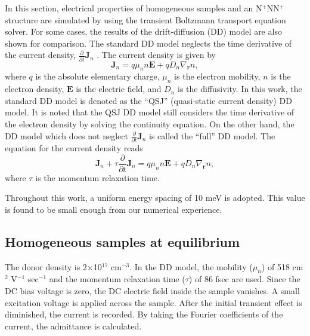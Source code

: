 \documentclass[journal]{IEEEtran}
\newcommand{\revision}[1]{{#1}}
\begin{document}
\revision{In this section, electrical properties of homogeneous samples and an N$^+$NN$^+$ structure are simulated by using the transient Boltzmann transport equation solver. 
   For some cases, the results of the drift-diffusion (DD) model are also shown for comparison.}
   The standard DD model neglects the time derivative of the current density, $\frac{\partial}{\partial t}\mathbf{J}_n$ \cite{Grasser2003}.
\revision{The current density is given by
\begin{equation}
\mathbf{J}_n = q \mu_n n \mathbf{E} + q D_n \nabla_{\mathbf{r}} n,
\end{equation}   
where $q$ is the absolute elementary charge, $\mu_n$ is the electron mobility, $n$ is the electron density, \revision{$\mathbf{E}$ is the electric field,} and $D_n$ is the diffusivity.
   In this work, the standard DD model is denoted as the ``QSJ'' (quasi-static current density) DD model.
   It is noted that the QSJ DD model still considers the time derivative of the electron density by solving the continuity equation.    
   On the other hand, the DD model which does not neglect $\frac{\partial}{\partial t}\mathbf{J}_n$ \cite{Jungemann2017} is called the ``full'' DD model.
   The equation for the current density reads
\begin{equation}
\mathbf{J}_n + \tau \frac{\partial}{\partial t}\mathbf{J}_n = q \mu_n n \mathbf{E} + q D_n \nabla_{\mathbf{r}} n,
\end{equation}  
where $\tau$ is the momentum relaxation time. 
}

\revision{Throughout this work, a uniform energy spacing of 10 meV is adopted.
   This value is found to be small enough from our numerical experience.}
   
\subsection{Homogeneous samples at equilibrium}

\revision{The donor density is 2$\times$10$^{17}$ cm$^{-3}$.
   In the DD model, the mobility ($\mu_n$) of 518 cm$^2$ V$^{-1}$ sec$^{-1}$ and the momentum relaxation time ($\tau$) of 86 fsec are used. 
   Since the DC bias voltage is zero, the DC electric field inside the sample vanishes.}
   A small excitation voltage is applied across the sample.
   After the initial transient effect is diminished, the current is recorded.
   By taking the Fourier coefficients of the current, the admittance is calculated.
   
\end{document}

